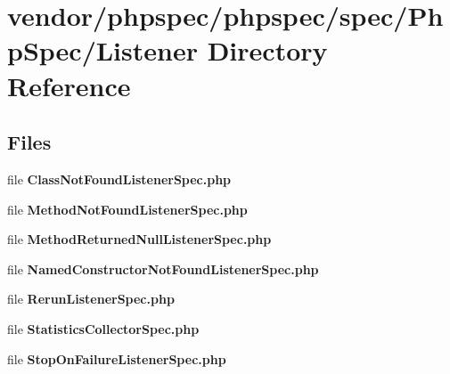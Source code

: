 \section{vendor/phpspec/phpspec/spec/\+Php\+Spec/\+Listener Directory Reference}
\label{dir_af1974ed91757d7c8314f7c30ac49608}
\subsection*{Files}
\begin{DoxyCompactItemize}
\item 
file {\bf Class\+Not\+Found\+Listener\+Spec.\+php}
\item 
file {\bf Method\+Not\+Found\+Listener\+Spec.\+php}
\item 
file {\bf Method\+Returned\+Null\+Listener\+Spec.\+php}
\item 
file {\bf Named\+Constructor\+Not\+Found\+Listener\+Spec.\+php}
\item 
file {\bf Rerun\+Listener\+Spec.\+php}
\item 
file {\bf Statistics\+Collector\+Spec.\+php}
\item 
file {\bf Stop\+On\+Failure\+Listener\+Spec.\+php}
\end{DoxyCompactItemize}
